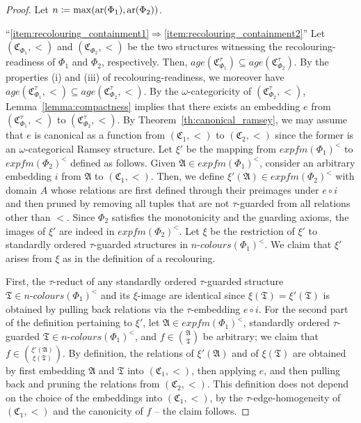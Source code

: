 \documentclass[oneside,reqno,12pt]{amsart}
\theoremstyle{plain}
\theoremstyle{remark}
\renewcommand{\coloneqq}{\mathrel{\mathop:}\mathrel{\mkern-1.2mu}=}
\newcommand{\struct}[1]{\mathfrak{#1}}
\newcommand{\age}{\ensuremath{\mathit{age}}\xspace}
\newcommand{\efm}{\ensuremath{\mathit{expfm}}\xspace}
\newcommand{\colours}{\ensuremath{n\text{-}\mathit{colours}}}
\newcommand{\ar}{\ensuremath{\mathrm{ar}}\xspace}
\begin{document}
{\recolouringreadycontainment* 
\begin{proof} Let $n\coloneqq \max(\ar(\Phi_1),\ar(\Phi_2))$.

``\eqref{item:recolouring_containment1}$\Rightarrow$\eqref{item:recolouring_containment2}''   
Let $(\struct{C}_{\Phi_1},<)$ and $(\struct{C}_{\Phi_2},<)$ be the two structures witnessing the recolouring-readiness of $\Phi_1$ and $\Phi_2$, respectively. 
Then, $\age(\struct{C}_{\Phi_1}^{\tau}) \subseteq  \age(\struct{C}_{\Phi_2}^{\tau})$.
By the properties (i) and (iii) of recolouring-readiness, we moreover have $\age(\struct{C}_{\Phi_1}^{\tau},<)\subseteq \age(\struct{C}_{\Phi_2}^{\tau},<)$.  
By the $\omega$-categoricity of $(\struct{C}_{\Phi_2}^{\tau},<)$,  Lemma~\ref{lemma:compactness} implies that there exists an embedding $e$ from $(\struct{C}_{\Phi_1}^{\tau},<)$ to $(\struct{C}_{\Phi_2}^{\tau},<)$.
By Theorem~\ref{th:canonical_ramsey}, we may assume that $e$ is canonical as a function from $(\struct{C}_1,<)$ to $(\struct{C}_2,<)$ since the former is an $\omega$-categorical Ramsey structure.
Let $\xi'$ be the mapping from $\efm(\Phi_1)^{<}$ to $\efm(\Phi_2)^{<}$ defined as follows.
Given $\struct{A}\in \efm(\Phi_1)^{<}$, consider an arbitrary embedding $i$ from $\struct{A}$ to $(\struct{C}_1,<)$.
Then, we define $\xi'(\struct{A}) \in \efm(\Phi_2)^{<}$ with domain $A$ whose relations are first defined through their preimages under $e\circ i$ and then pruned by removing all tuples that are not $\tau$-guarded from all relations other than $<$. 
Since $\Phi_2$ satisfies the monotonicity and the guarding axioms, the images of $\xi'$ are indeed in $\efm(\Phi_2)^{<}$.
Let $\xi$ be the restriction of $\xi'$ to standardly ordered $\tau$-guarded structures in $\colours(\Phi_1)^{<}$.
We claim that $\xi'$ arises from $\xi$ as in the definition of a recolouring. 

First, the $\tau$-reduct of any standardly ordered $\tau$-guarded structure $\struct{T}\in\colours(\Phi_1)^{<}$  and its $\xi$-image are identical since $\xi(\struct{T})=\xi'(\struct{T})$ is obtained by pulling back relations via the $\tau$-embedding $e\circ i$.  
For the second part of the definition pertaining to $\xi'$, let $\struct A\in\efm{(\Phi_1)}^{<}$, standardly ordered $\tau$-guarded $\struct{T}\in\colours(\Phi_1)^{<}$,  and $f\in \binom{\struct A}{\struct{T}}$
be arbitrary; we claim that $f\in \binom{\xi'(\struct A)}{\xi(\struct{T})}$.
By definition, the relations of $\xi'(\struct A)$ and of $\xi(\struct{T})$ are obtained by first embedding $\struct A$ and $\struct{T}$  into $(\struct{C}_1,<)$, then applying $e$, and then pulling back and pruning the relations from $(\struct{C}_2,<)$. 
This definition does not depend on the choice of the embeddings into $(\struct{C}_1,<)$, by the $\tau$-edge-homogeneity of $(\struct{C}_1,<)$ and the canonicity of $f$ -- the claim follows. 


\end{proof}}
\end{document}
